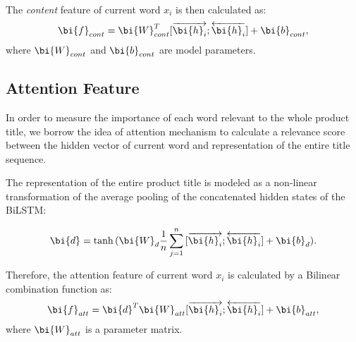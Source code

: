 The \textit{content} feature of current word $x_i$ is then calculated as:
\begin{equation}
\label{eqn:content}
\bi{f}_{cont} = \bi{W}_{cont}^T [\overrightarrow{\bi{h}_i};\overleftarrow{\bi{h}_i}] + \bi{b}_{cont},
\end{equation}
where $\bi{W}_{cont}$ and $\bi{b}_{cont}$ are model parameters.




\subsection{Attention Feature}

In order to measure the importance of each word relevant to the whole product title, we borrow the idea of attention mechanism \cite{bahdanau2014neural,luong2015effective} to calculate a relevance score between the hidden vector of current word and representation of the entire title sequence.

The representation of the entire product title is modeled as a non-linear transformation of the average pooling of the concatenated hidden states of the BiLSTM:

\begin{equation}
\bi{d}=\tanh{(\bi{W}_d{\frac{1}{n}}\sum_{j=1}^{n}{[\overrightarrow{\bi{h}_i};\overleftarrow{\bi{h}_i}]}+\bi{b}_d)}.
\end{equation}

Therefore, the attention feature of current word $x_i$ is calculated by a Bilinear combination function as:
\begin{equation}
\label{eqn:attention}
\bi{f}_{att} = \bi{d}^T\bi{W}_{att} [\overrightarrow{\bi{h}_i};\overleftarrow{\bi{h}_i}] + \bi{b}_{att},
\end{equation}
where $\bi{W}_{att}$ is a parameter matrix.

